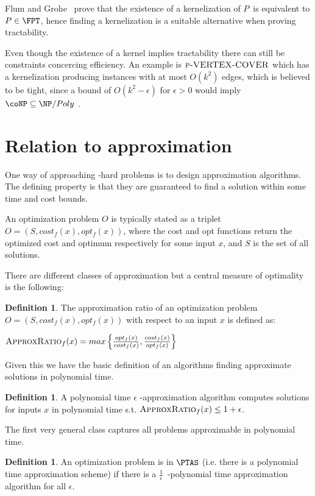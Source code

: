 \documentclass[a4paper,11pt]{report}
\theoremstyle{plain}
\theoremstyle{definition}
\newtheorem{defn}[thm]{Definition} %
\begin{document}
Flum and Grohe~\cite{FG06} prove that the existence of a kernelization of $P$ is equivalent to $P \in \FPT$, hence finding a kernelization is a suitable alternative when proving tractability.

Even though the existence of a kernel implies tractability there can still be constraints concercing efficiency.
An example is $\textsc{p-VERTEX-COVER}$ which has a kernelization producing instances with at most $O(k^2)$ edges, which is believed to be tight, since a bound of $O(k^2 - \epsilon)$ for $\epsilon > 0$
would imply $\coNP \subseteq \NP /Poly$ \cite{DELL10}.

\section{Relation to approximation}
\label{sec:approx}
One way of approaching \NP-hard problems is to design approximation algorithms.
The defining property is that they are guaranteed to find a solution within some time and cost bounds.

An optimization problem $O$ is typically stated as a triplet $O = (S, cost_f(x), opt_f(x))$,
where the cost and opt functions return the optimized cost and optimum respectively for some input $x$, and $S$ is the set of all solutions.

There are different classes of approximation but a central measure of optimality is the following:

\begin{defn}
The approximation ratio of an optimization problem $O = (S, cost_f(x), opt_f(x))$ with respect to an input $x$ is defined as:

$\textsc{ApproxRatio}_f(x) = max \left\{ \frac{opt_f(x)}{cost_f(x)}, \frac{cost_f(x)}{opt_f(x)} \right\}$
\end{defn}

Given this we have the basic definition of an algorithms finding approximate solutions in polynomial time.

\begin{defn}
A polynomial time $\epsilon$ -approximation algorithm computes solutions for inputs $x$ in polynomial time s.t. $\textsc{ApproxRatio}_f(x) \leq 1 + \epsilon$.
\end{defn}

The first very general class captures all problems approximable in polynomial time.

\begin{defn}
An optimization problem is in $\PTAS$ (i.e. there is a polynomial time approximation scheme) if there is a $\frac{1}{\epsilon}$ -polynomial time approximation algorithm for all $\epsilon$.
\end{defn}
\end{document}
